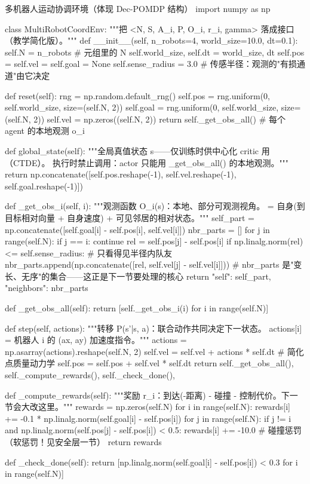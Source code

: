 \begin{codebox}[Python]{多机器人运动协调环境（体现 Dec-POMDP 结构）}
import numpy as np

class MultiRobotCoordEnv:
    """把 <N, S, {A_i}, P, {O_i}, {r_i}, gamma> 落成接口（教学简化版）。"""
    def __init__(self, n_robots=4, world_size=10.0, dt=0.1):
        self.N = n_robots                  # 元组里的 N
        self.world_size, self.dt = world_size, dt
        self.pos = self.vel = self.goal = None
        self.sense_radius = 3.0            # 传感半径：观测的"有损通道"由它决定

    def reset(self):
        rng = np.random.default_rng()
        self.pos  = rng.uniform(0, self.world_size, size=(self.N, 2))
        self.goal = rng.uniform(0, self.world_size, size=(self.N, 2))
        self.vel  = np.zeros((self.N, 2))
        return self._get_obs_all()         # 每个 agent 的本地观测 o_i

    def global_state(self):
        """全局真值状态 s——仅训练时供中心化 critic 用（CTDE）。
        执行时禁止调用：actor 只能用 _get_obs_all() 的本地观测。"""
        return np.concatenate([self.pos.reshape(-1),
                               self.vel.reshape(-1), self.goal.reshape(-1)])

    def _get_obs_i(self, i):
        """观测函数 O_i(s)：本地、部分可观测视角。
        = 自身(到目标相对向量 + 自身速度) + 可见邻居的相对状态。"""
        self_part = np.concatenate([self.goal[i] - self.pos[i], self.vel[i]])
        nbr_parts = []
        for j in range(self.N):
            if j == i:
                continue
            rel = self.pos[j] - self.pos[i]
            if np.linalg.norm(rel) <= self.sense_radius:   # 只看得见半径内队友
                nbr_parts.append(np.concatenate([rel, self.vel[j] - self.vel[i]]))
        # nbr_parts 是"变长、无序"的集合——这正是下一节要处理的核心
        return {"self": self_part, "neighbors": nbr_parts}

    def _get_obs_all(self):
        return [self._get_obs_i(i) for i in range(self.N)]

    def step(self, actions):
        """转移 P(s'|s, a)：联合动作共同决定下一状态。
        actions[i] = 机器人 i 的 (ax, ay) 加速度指令。"""
        actions = np.asarray(actions).reshape(self.N, 2)
        self.vel = self.vel + actions * self.dt          # 简化点质量动力学
        self.pos = self.pos + self.vel * self.dt
        return self._get_obs_all(), self._compute_rewards(), self._check_done(), {}

    def _compute_rewards(self):
        """奖励 r_i：到达(-距离) - 碰撞 - 控制代价。下一节会大改这里。"""
        rewards = np.zeros(self.N)
        for i in range(self.N):
            rewards[i] += -0.1 * np.linalg.norm(self.goal[i] - self.pos[i])
            for j in range(self.N):
                if j != i and np.linalg.norm(self.pos[j] - self.pos[i]) < 0.5:
                    rewards[i] += -10.0          # 碰撞惩罚（软惩罚！见安全层一节）
        return rewards

    def _check_done(self):
        return [np.linalg.norm(self.goal[i] - self.pos[i]) < 0.3
                for i in range(self.N)]
\end{codebox}

